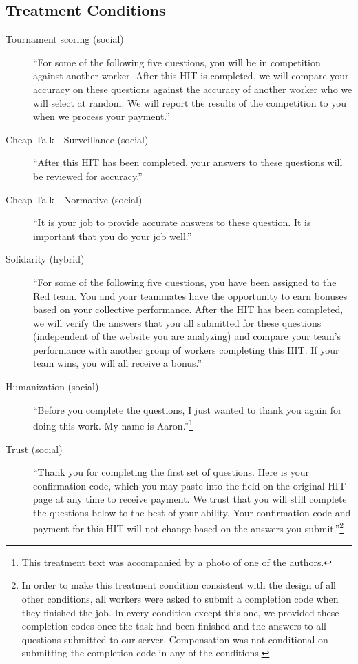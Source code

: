 \documentclass{chi2009}
\begin{document}
{\subsection{Treatment Conditions}

\begin{description}
\item[Tournament scoring (social)] ``For some of the following five questions, you will be in competition against another worker. After this HIT is completed, we will compare your accuracy on these questions against the accuracy of another worker who we will select at random. We will report the results of the competition to you when we process your payment.''%

\item[Cheap Talk---Surveillance (social)] ``After this HIT has been
  completed, your answers to these questions will be reviewed for
  accuracy.'' %
\item[Cheap Talk---Normative (social)] ``It is your job to provide
  accurate answers to these question. It is important that you do your
  job well.'' %
\item[Solidarity (hybrid)] ``For some of the following five questions,
  you have been assigned to the Red team. You and your teammates have
  the opportunity to earn bonuses based on your collective
  performance. After the HIT has been completed, we will verify the
  answers that you all submitted for these questions (independent of
  the website you are analyzing) and compare your team's performance
  with another group of workers completing this HIT. If your team
  wins, you will all receive a bonus.'' %
\item[Humanization (social)] ``Before you complete the questions, I
  just wanted to thank you again for doing this work. My name is
  Aaron.''\footnote{This treatment text was accompanied by a photo of one of the authors.} %
\item[Trust (social)] ``Thank you for completing the first set of
  questions. Here is your confirmation code, which you may paste into
  the field on the original HIT page at any time to receive
  payment. We trust that you will still complete the questions below
  to the best of your ability. Your confirmation code and payment for
  this HIT will not change based on the answers you
  submit.''\footnote{In order to make this treatment condition consistent with the design of all other conditions, all workers were asked to submit a completion code when they finished the job. In every condition except this one, we provided these completion codes once the task had been finished and the answers to all questions submitted to our server. Compensation was not conditional on submitting the completion code in any of the conditions.} %

\end{description}}
\end{document}
